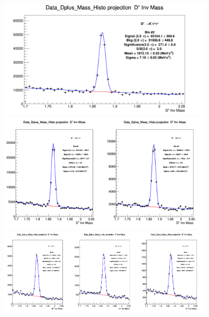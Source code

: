 \begin{figure}[h]
\centering
{\includegraphics[width=0.94\textwidth]{figures/DplusPlotsweff/InvMassDistributions_Dplus_Bins2to2.png}}
{\includegraphics[width=0.94\textwidth]{figures/DplusPlotsweff/InvMassDistributions_Dplus_Bins3to4.png}}
{\includegraphics[width=0.94\textwidth]{figures/DplusPlotsweff/InvMassDistributions_Dplus_Bins5to7.png}}
\end{figure}

